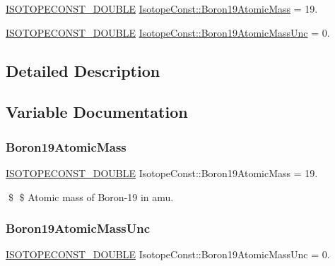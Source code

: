 \begin{DoxyCompactItemize}
\item 
\mbox{\hyperlink{group___isotope_const-_macros_ga8f45a7272ce02c0b4c65c44636ed719a}{I\+S\+O\+T\+O\+P\+E\+C\+O\+N\+S\+T\+\_\+\+D\+O\+U\+B\+LE}} \mbox{\hyperlink{group___isotope_const-_boron-_b19_gaf726d4e11d22da3266bdce87f9b1b6af}{Isotope\+Const\+::\+Boron19\+Atomic\+Mass}} = 19.
\item 
\mbox{\hyperlink{group___isotope_const-_macros_ga8f45a7272ce02c0b4c65c44636ed719a}{I\+S\+O\+T\+O\+P\+E\+C\+O\+N\+S\+T\+\_\+\+D\+O\+U\+B\+LE}} \mbox{\hyperlink{group___isotope_const-_boron-_b19_ga7e80e4af8e7f439036e1b136c8de9dd1}{Isotope\+Const\+::\+Boron19\+Atomic\+Mass\+Unc}} = 0.
\end{DoxyCompactItemize}


\subsection{Detailed Description}


\subsection{Variable Documentation}
\mbox{\label{group___isotope_const-_boron-_b19_gaf726d4e11d22da3266bdce87f9b1b6af}} 
\subsubsection{\texorpdfstring{Boron19\+Atomic\+Mass}{Boron19AtomicMass}}
{\footnotesize\ttfamily \mbox{\hyperlink{group___isotope_const-_macros_ga8f45a7272ce02c0b4c65c44636ed719a}{I\+S\+O\+T\+O\+P\+E\+C\+O\+N\+S\+T\+\_\+\+D\+O\+U\+B\+LE}} Isotope\+Const\+::\+Boron19\+Atomic\+Mass = 19.}

\$ \$ Atomic mass of Boron-\/19 in amu. \mbox{\label{group___isotope_const-_boron-_b19_ga7e80e4af8e7f439036e1b136c8de9dd1}} 
\subsubsection{\texorpdfstring{Boron19\+Atomic\+Mass\+Unc}{Boron19AtomicMassUnc}}
{\footnotesize\ttfamily \mbox{\hyperlink{group___isotope_const-_macros_ga8f45a7272ce02c0b4c65c44636ed719a}{I\+S\+O\+T\+O\+P\+E\+C\+O\+N\+S\+T\+\_\+\+D\+O\+U\+B\+LE}} Isotope\+Const\+::\+Boron19\+Atomic\+Mass\+Unc = 0.}

